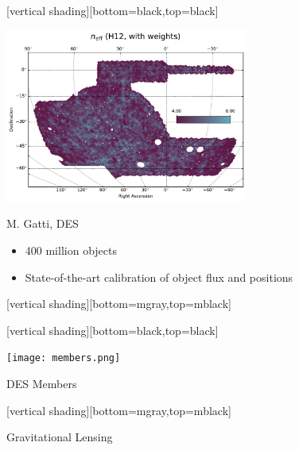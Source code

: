 \documentclass{beamer}
\begin{document}
{
    [vertical shading][bottom=black,top=black]

    \frame
    {

        \begin{center}
            \includegraphics[width=0.6\textwidth]{neffw.pdf}

            {\tiny \hfill M. Gatti, DES}
        \end{center}
        \begin{itemize}

            \item 400 million objects

            \item State-of-the-art calibration of object flux and positions

        \end{itemize}
    }

    [vertical shading][bottom=mgray,top=mblack]

}

{
    [vertical shading][bottom=black,top=black]
	
    \frame
    {

        \begin{center}
            \texttt{[image: members.png]}

            {\tiny \hfill DES Members}
        \end{center}
    }

    [vertical shading][bottom=mgray,top=mblack]

}


\frame
{

    {\Huge Gravitational Lensing}

}
\end{document}
